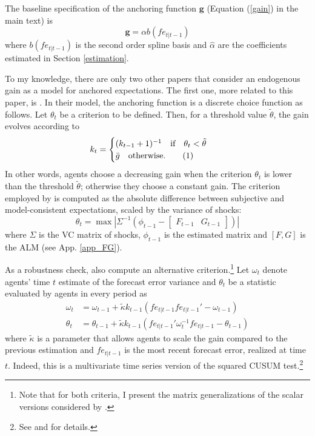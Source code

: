 \documentclass[11pt]{article}
\renewcommand{\[}{\begin{equation}}
\renewcommand{\]}{\end{equation}}
\newcommand\numberthis{\addtocounter{equation}{1}\tag{\theequation}} %
\begin{document}
The baseline specification of the anchoring function $\mathbf{g}$ (Equation (\ref{gain}) in the main text) is \begin{equation}
\mathbf{g} = \alpha b(fe_{t|t-1})
\end{equation}
where $ b(fe_{t|t-1})$ is the second order spline basis and $\hat{\alpha}$ are the coefficients estimated in Section \ref{estimation}.

To my knowledge, there are only two other papers that consider an endogenous gain as a model for anchored expectations. The first one, more related to this paper, is \cite{carvalho2019anchored}. In their model, the anchoring function is a discrete choice function as follows. Let $\theta_t$ be a criterion to be defined. Then, for a threshold value $\tilde{\theta}$, the gain evolves according to
\begin{align*}
k_t & = \begin{cases} (k_{t-1}+1)^{-1} \quad \text{if} \quad \theta_t < \tilde{\theta}  \\ \bar{g}  \quad \text{otherwise.}\numberthis \label{anchoring_kinked}
\end{cases} 
\end{align*}
In other words, agents choose a decreasing gain when the criterion $\theta_t$ is lower than the threshold $\tilde{\theta}$; otherwise they choose a constant gain. The criterion employed by \cite{carvalho2019anchored} is computed as the absolute difference between subjective and model-consistent expectations, scaled by the variance of shocks:
\begin{equation}
\theta_t = \max | \Sigma^{-1} ( \phi_{t-1} - \begin{bmatrix} F_{t-1} & G_{t-1} \end{bmatrix}) |
\end{equation}
where $\Sigma$ is the VC matrix of shocks, $\phi_{t-1}$ is the estimated matrix and $[F,G]$ is the ALM (see App. \ref{app_FG}).

As a robustness check, \cite{carvalho2019anchored} also compute an alternative criterion.\footnote{Note that for both criteria, I present the matrix generalizations of the scalar versions considered by \cite{carvalho2019anchored}.} Let $\omega_t$ denote agents' time $t$ estimate of the forecast error variance and $\theta_t$ be a statistic evaluated by agents in every period as
\begin{align}
\omega_t & =  \omega_{t-1} + \tilde{\kappa} k_{t-1}(fe_{t|t-1} fe_{t|t-1}'  -\omega_{t-1})\\
\theta_t & =  \theta_{t-1} + \tilde{\kappa} k_{t-1}(fe_{t|t-1}'\omega_t^{-1}fe_{t|t-1} -\theta_{t-1}) \label{cusum_crit}
\end{align}
where $\tilde{\kappa}$ is a parameter that allows agents to scale the gain compared to the previous estimation and $fe_{t|t-1}$ is the most recent forecast error, realized at time $t$. Indeed, this is a multivariate time series version of the squared CUSUM test.\footnote{See \cite{brown1975techniques} and \cite{lutkepohl2013introduction} for details.}
\end{document}
